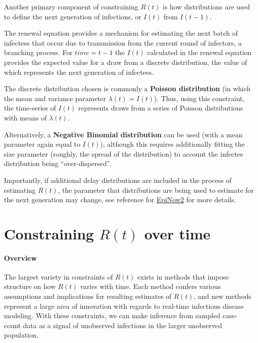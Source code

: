 \documentclass[
  letterpaper,
  DIV=11,
  numbers=noendperiod]{scrreprt}
\begin{document}

Another primary component of constraining \(R(t)\) is how distributions
are used to define the next generation of infections, or \(I(t)\) from
\(I(t-1)\).

The renewal equation provides a mechanism for estimating the next batch
of infectees that occur due to transmission from the current round of
infectors, a branching process. For \(time = t-1\) the \(I(t)\)
calculated in the renewal equation provides the expected value for a
draw from a discrete distribution, the value of which represents the
next generation of infectees.

The discrete distribution chosen is commonly a \textbf{Poisson
distribution} (in which the mean and variance parameter \(λ(t)=I(t)\)).
Thus, using this constraint, the time-series of \(I(t)\) represents
draws from a series of Poisson distributions with means of \(λ(t)\).

Alternatively, a \textbf{Negative Binomial distribution} can be used
(with a mean parameter again equal to \(I(t)\)), although this requires
additionally fitting the size parameter (roughly, the spread of the
distribution) to account the infectee distribution being
``over-dispersed''.

Importantly, if additional delay distributions are included in the
process of estimating \(R(t)\), the parameter that distributions are
being used to estimate for the next generation may change, see reference
for \href{package_EpiNow2.qmd}{EpiNow2} for more details.

\chapter*{\texorpdfstring{Constraining \(R(t)\) over
time}{Constraining R(t) over time}}\label{constraining-rt-over-time}


\subsubsection*{Overview}\label{overview-2}

The largest variety in constraints of \(R(t)\) exists in methods that
impose structure on how \(R(t)\) varies with time. Each method confers
various assumptions and implications for resulting estimates of
\(R(t)\), and new methods represent a large area of innovation with
regards to real-time infectious disease modeling. With these
constraints, we can make inference from sampled case-count data as a
signal of unobserved infections in the larger unobserved population.
\end{document}
